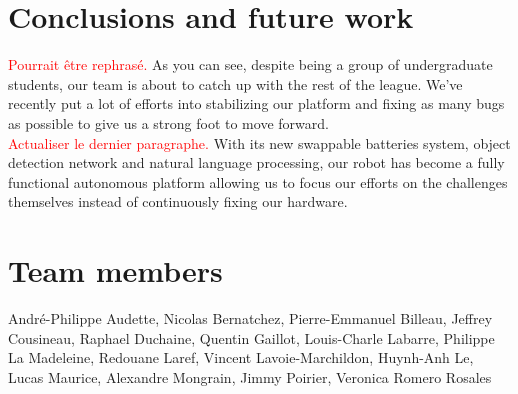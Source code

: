 \documentclass[runningheads,a4paper]{llncs}
\newcommand\notes[1]{\textcolor{red}{#1}}
\begin{document}
\section{Conclusions and future work} 
\notes{Pourrait être rephrasé.}
As you can see, despite being a group of undergraduate students, our team is about to catch up with the rest of the league. We’ve recently put a lot of efforts into stabilizing our platform and fixing as many bugs as possible to give us a strong foot to move forward.\\

\notes{Actualiser le dernier paragraphe.}
With its new swappable batteries system, object detection network and natural language processing, our robot has become a fully functional autonomous platform allowing us to focus our efforts on the challenges themselves instead of continuously fixing our hardware.
\\


	
\section*{Team members}
André-Philippe Audette,
Nicolas Bernatchez,
Pierre-Emmanuel Billeau,
Jeffrey Cousineau, 
Raphael Duchaine,
Quentin Gaillot,
Louis-Charle Labarre, 
Philippe La Madeleine,  
Redouane Laref,
Vincent Lavoie-Marchildon,
Huynh-Anh Le,
Lucas Maurice,
Alexandre Mongrain,
Jimmy Poirier,
Veronica Romero Rosales

\nocite{*}


\end{document}
